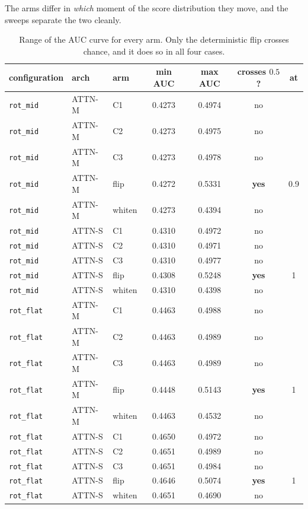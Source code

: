 \documentclass[11pt,a4paper]{article}
\begin{document}
The arms differ in \emph{which} moment of the score distribution they move, and
the sweeps separate the two cleanly.


\begin{table}[h]\centering\small
\begin{tabular}{lllcccc}
\toprule
configuration & arch & arm & min AUC & max AUC & crosses $0.5$? & at \\
\midrule
\texttt{rot\_mid} & ATTN-M & C1 & 0.4273 & 0.4974 & no &  \\
\texttt{rot\_mid} & ATTN-M & C2 & 0.4273 & 0.4975 & no &  \\
\texttt{rot\_mid} & ATTN-M & C3 & 0.4273 & 0.4978 & no &  \\
\texttt{rot\_mid} & ATTN-M & flip & 0.4272 & 0.5331 & \textbf{yes} & 0.9 \\
\texttt{rot\_mid} & ATTN-M & whiten & 0.4273 & 0.4394 & no &  \\
\texttt{rot\_mid} & ATTN-S & C1 & 0.4310 & 0.4972 & no &  \\
\texttt{rot\_mid} & ATTN-S & C2 & 0.4310 & 0.4971 & no &  \\
\texttt{rot\_mid} & ATTN-S & C3 & 0.4310 & 0.4977 & no &  \\
\texttt{rot\_mid} & ATTN-S & flip & 0.4308 & 0.5248 & \textbf{yes} & 1 \\
\texttt{rot\_mid} & ATTN-S & whiten & 0.4310 & 0.4398 & no &  \\
\texttt{rot\_flat} & ATTN-M & C1 & 0.4463 & 0.4988 & no &  \\
\texttt{rot\_flat} & ATTN-M & C2 & 0.4463 & 0.4989 & no &  \\
\texttt{rot\_flat} & ATTN-M & C3 & 0.4463 & 0.4989 & no &  \\
\texttt{rot\_flat} & ATTN-M & flip & 0.4448 & 0.5143 & \textbf{yes} & 1 \\
\texttt{rot\_flat} & ATTN-M & whiten & 0.4463 & 0.4532 & no &  \\
\texttt{rot\_flat} & ATTN-S & C1 & 0.4650 & 0.4972 & no &  \\
\texttt{rot\_flat} & ATTN-S & C2 & 0.4651 & 0.4989 & no &  \\
\texttt{rot\_flat} & ATTN-S & C3 & 0.4651 & 0.4984 & no &  \\
\texttt{rot\_flat} & ATTN-S & flip & 0.4646 & 0.5074 & \textbf{yes} & 1 \\
\texttt{rot\_flat} & ATTN-S & whiten & 0.4651 & 0.4690 & no &  \\
\bottomrule
\end{tabular}
\caption{Range of the AUC curve for every arm. Only the deterministic flip
crosses chance, and it does so in all four cases.}
\end{table}
\end{document}
